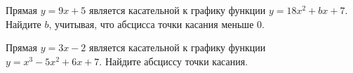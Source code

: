 \begin{homework}[number=3]
	\begin{listofex}
		\item Прямая \( y=9x+5 \) является касательной к графику функции \( y=18x^2+bx+7 \). Найдите \( b \), учитывая, что абсцисса точки касания меньше \( 0 \).
		\item Прямая \( y=3x-2 \) является касательной к графику функции \( y=x^3-5x^2+6x+7 \). Найдите абсциссу точки касания.
	\end{listofex}
\end{homework}

%	

%	
